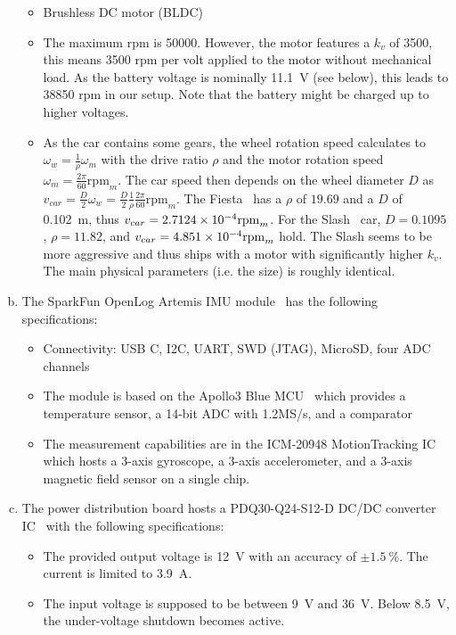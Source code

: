 \documentclass[letta4 paper]{article}
\numberwithin{equation}{section}
\newcommand{\0}{\mathbf{0}}
\begin{document}
\begin{enumerate}[a.) ]
\begin{itemize}
         \item Brushless DC motor (BLDC)
         \item The maximum rpm is 50000. However, the motor features a $k_v$ of 3500, this means 3500 rpm per volt applied to the motor without mechanical load. As the battery voltage is nominally \SI{11.1}{V} (see below), this leads to 38850 rpm in our setup. Note that the battery might be charged up to higher voltages.
         \item As the car contains some gears, the wheel rotation speed calculates to $\omega_{w} = \frac{1}{\rho} \omega_{m}$ with the drive ratio $\rho$ and the motor rotation speed $\omega_{m} = \frac{2\pi}{60} \mathrm{rpm}_{m}$. The car speed then depends on the wheel diameter $D$ as $v_{car} = \frac{D}{2} \omega_{w} = \frac{D}{2} \frac{1}{\rho} \frac{2\pi}{60} \mathrm{rpm}_{m}$. The Fiesta~\cite{fiesta} has a $\rho$ of $19.69$ and a $D$ of \SI{0.102}{m}, thus $v_{car} = \num{2.7124E-4} \mathrm{rpm}_{m}$. For the Slash~\cite{slash} car, $D=0.1095$, $\rho=11.82$, and $v_{car} = \num{4.851E-4} \mathrm{rpm}_{m}$ hold. The Slash seems to be more aggressive and thus ships with a motor with significantly higher $k_v$. The main physical parameters (i.e. the size) is roughly identical.
      \end{itemize}
      \item The SparkFun OpenLog Artemis IMU module~\cite{imu} has the following specifications: \begin{itemize}
         \item Connectivity: USB C, I2C, UART, SWD (JTAG), MicroSD, four ADC channels
         \item The module is based on the Apollo3 Blue MCU~\cite{imu-mcu} which provides a temperature sensor, a 14-bit ADC with 1.2MS/s, and a comparator
         \item The measurement  capabilities are in the ICM-20948 MotionTracking IC~\cite{imu-sensor} which hosts a 3-axis gyroscope, a 3-axis accelerometer, and a 3-axis magnetic field sensor on a single chip.
      \end{itemize}
      \item The power distribution board hosts a PDQ30-Q24-S12-D DC/DC converter IC~\cite{dcdc} with the following specifications: \begin{itemize}
         \item The provided output voltage is \SI{12}{V} with an accuracy of $\pm \SI{1.5}{\percent}$. The current is limited to \SI{3.9}{A}.
         \item The input voltage is supposed to be between \SI{9}{V} and \SI{36}{V}. Below \SI{8.5}{V}, the under-voltage shutdown becomes active.

\end{itemize}
\end{enumerate}
\end{document}
